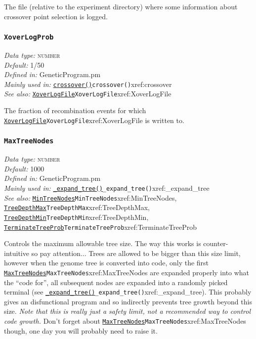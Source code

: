 \documentclass[a4paper]{article}
\begin{document}
The file (relative to the experiment directory) where some information
about crossover point selection is logged.

\subsubsection{\texttt{XoverLogProb}}\label{xref:XoverLogProb}
\begin{flushleft}
\textit{Data type:} \textsc{number}\\
\textit{Default:} 1/50\\
\textit{Defined in:} GeneticProgram.pm\\
\textit{Mainly used in:} \hyperref[no]{\texttt{crossover()}}{\texttt{crossover()}}{xref:crossover}\\
\textit{See also:} \hyperref[no]{\texttt{XoverLogFile}}{\texttt{XoverLogFile}}{xref:XoverLogFile}
\end{flushleft}

The fraction of recombination events for which \hyperref[no]{\texttt{XoverLogFile}}{\texttt{XoverLogFile}}{xref:XoverLogFile}
is written to.

\subsubsection{\texttt{MaxTreeNodes}}\label{xref:MaxTreeNodes}
\begin{flushleft}
\textit{Data type:} \textsc{number}\\
\textit{Default:} 1000\\
\textit{Defined in:} GeneticProgram.pm\\
\textit{Mainly used in:} \hyperref[no]{\texttt{\_expand\_tree()}}{\texttt{\_expand\_tree()}}{xref:_expand_tree}\\
\textit{See also:} \hyperref[no]{\texttt{MinTreeNodes}}{\texttt{MinTreeNodes}}{xref:MinTreeNodes}, \hyperref[no]{\texttt{TreeDepthMax}}{\texttt{TreeDepthMax}}{xref:TreeDepthMax}, \hyperref[no]{\texttt{TreeDepthMin}}{\texttt{TreeDepthMin}}{xref:TreeDepthMin}, \hyperref[no]{\texttt{TerminateTreeProb}}{\texttt{TerminateTreeProb}}{xref:TerminateTreeProb}
\end{flushleft}

Controls the maximum allowable tree size.  The way this works is
counter-intuitive so pay attention...  Trees are allowed to be bigger
than this size limit, however when the genome tree is converted into
code, only the first \hyperref[no]{\texttt{MaxTreeNodes}}{\texttt{MaxTreeNodes}}{xref:MaxTreeNodes} are expanded properly into
what the ``code for'', all subsequent nodes are expanded into a
randomly picked terminal (see \hyperref[no]{\texttt{\_expand\_tree()}}{\texttt{\_expand\_tree()}}{xref:_expand_tree}).  This
probably gives an disfunctional program and so indirectly prevents
tree growth beyond this size.  \textit{Note that this is really just a
safety limit, not a recommended way to control code growth.}  Don't
forget about \hyperref[no]{\texttt{MaxTreeNodes}}{\texttt{MaxTreeNodes}}{xref:MaxTreeNodes} though, one day you will probably
need to raise it.
\end{document}
